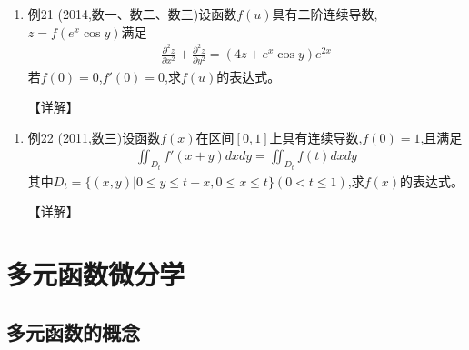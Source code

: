 \documentclass[12pt, a4paper, oneside, UTF8]{ctexbook}
\begin{document}
\begin{remark}
\end{remark}

\begin{enumerate}[label=\arabic*.,start=21]
    \item 例21 (2014,数一、数二、数三)设函数$f(u)$具有二阶连续导数,$z=f(e^x\cos y)$满足
    \begin{align*}
        \frac{\partial^2 z}{\partial x^2}+\frac{\partial^2 z}{\partial y^2}=(4z+e^x\cos y)e^{2x}
    \end{align*}
    若$f(0)=0$,$f'(0)=0$,求$f(u)$的表达式。
    
    \begin{solution}
    【详解】
    \end{solution}
\end{enumerate}

\begin{remark}
\end{remark}

\begin{enumerate}[label=\arabic*.,start=22]
    \item 例22 (2011,数三)设函数$f(x)$在区间$[0,1]$上具有连续导数,$f(0)=1$,且满足
    \begin{align*}
        \iint_{D_t} f'(x+y)dxdy=\iint_{D_t} f(t)dxdy
    \end{align*}
    其中$D_t=\{(x,y)|0\leq y\leq t-x,0\leq x\leq t\}(0<t\leq1)$,求$f(x)$的表达式。
    
    \begin{solution}
    【详解】
    \end{solution}
\end{enumerate}

\section{多元函数微分学}
\subsection{多元函数的概念}
\end{document}
